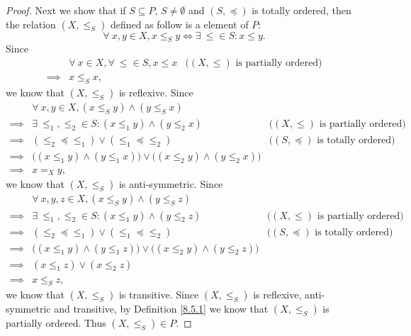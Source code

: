 \begin{proof}
    Next we show that if \(S \subseteq P\), \(S \neq \emptyset\) and \((S, \preceq)\) is totally ordered, then the relation \((X, \leq_S)\) defined as follow is a element of \(P\):
    \[
        \forall\ x, y \in X, x \leq_S y \iff \exists\ \leq \in S : x \leq y.
    \]
    Since
    \begin{align*}
                 & \forall\ x \in X, \forall\ \leq \in S, x \leq x & \text{(\((X, \leq)\) is partially ordered)} \\
        \implies & x \leq_S x,
    \end{align*}
    we know that \((X, \leq_S)\) is reflexive.
    Since
    \begin{align*}
                 & \forall\ x, y \in X, (x \leq_S y) \land (y \leq_S x)                                                                                    \\
        \implies & \exists\ \leq_1, \leq_2 \in S : (x \leq_1 y) \land (y \leq_2 x)                          & \text{(\((X, \leq)\) is partially ordered)}  \\
        \implies & (\leq_2 \preceq \leq_1) \lor (\leq_1 \preceq \leq_2)                                     & \text{(\((S, \preceq)\) is totally ordered)} \\
        \implies & \big((x \leq_1 y) \land (y \leq_1 x)\big) \lor \big((x \leq_2 y) \land (y \leq_2 x)\big)                                                \\
        \implies & x =_X y,
    \end{align*}
    we know that \((X, \leq_S)\) is anti-symmetric.
    Since
    \begin{align*}
                 & \forall\ x, y, z \in X, (x \leq_S y) \land (y \leq_S z)                                                                                 \\
        \implies & \exists\ \leq_1, \leq_2 \in S : (x \leq_1 y) \land (y \leq_2 z)                          & \text{(\((X, \leq)\) is partially ordered)}  \\
        \implies & (\leq_2 \preceq \leq_1) \lor (\leq_1 \preceq \leq_2)                                     & \text{(\((S, \preceq)\) is totally ordered)} \\
        \implies & \big((x \leq_1 y) \land (y \leq_1 z)\big) \lor \big((x \leq_2 y) \land (y \leq_2 z)\big)                                                \\
        \implies & (x \leq_1 z) \lor (x \leq_2 z)                                                                                                          \\
        \implies & x \leq_S z,
    \end{align*}
    we know that \((X, \leq_S)\) is transitive.
    Since \((X, \leq_S)\) is reflexive, anti-symmetric and transitive, by Definition \ref{8.5.1} we know that \((X, \leq_S)\) is partially ordered.
    Thus \((X, \leq_S) \in P\).


\end{proof}
